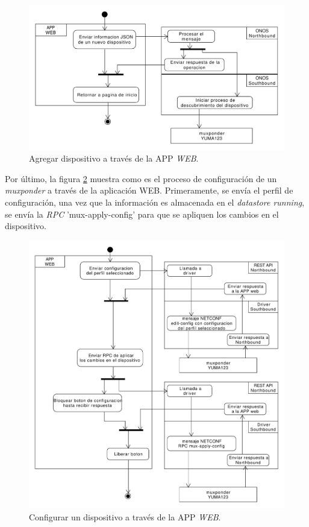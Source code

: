 \begin{itemize}
    \begin{figure}[H]
        \centering
        \includegraphics[scale=0.45]{Figures/agregar_disp_web.pdf}
        \caption{Agregar dispositivo a través de la APP \textit{WEB}.}
        \label{fig:agregar_disp_web}
      \end{figure}

    Por último, la figura \ref{fig:config_disp_web} muestra como es el proceso de configuración de un \textit{muxponder} a través de la aplicación WEB. Primeramente, se envía el perfil de configuración, una vez que la información es almacenada en el \textit{datastore running}, se envía la \textit{RPC} 'mux-apply-config' para que se apliquen los cambios en el dispositivo.

    \begin{figure}[H]
        \centering
        \includegraphics[scale=0.45]{Figures/config_disp_web.pdf}
        \caption{Configurar un dispositivo a través de la APP \textit{WEB}.}
        \label{fig:config_disp_web}
      \end{figure}


\end{itemize}
